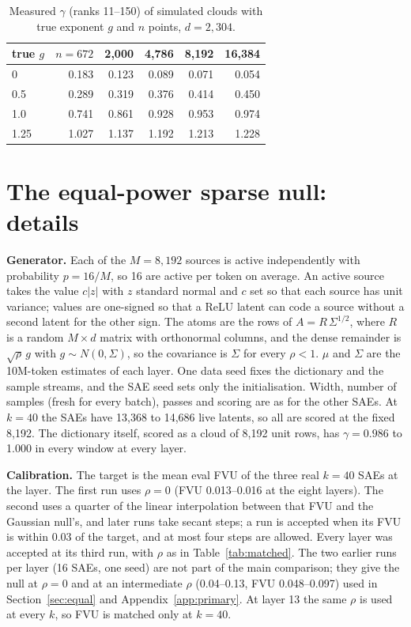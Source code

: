 \documentclass{article}
\newcommand{\Sig}{\Sigma}
\begin{document}
\begin{table}[!htb]
\centering
\caption{Measured $\gamma$ (ranks 11--150) of simulated clouds with true exponent $g$ and $n$ points, $d=2{,}304$.}
\label{tab:live}
\small
\begin{tabular}{l rrrrr}
\toprule
true $g$ & $n=672$ & 2,000 & 4,786 & 8,192 & 16,384 \\
\midrule
0 & 0.183 & 0.123 & 0.089 & 0.071 & 0.054 \\
0.5 & 0.289 & 0.319 & 0.376 & 0.414 & 0.450 \\
1.0 & 0.741 & 0.861 & 0.928 & 0.953 & 0.974 \\
1.25 & 1.027 & 1.137 & 1.192 & 1.213 & 1.228 \\
\bottomrule
\end{tabular}
\end{table}

\section{The equal-power sparse null: details}
\label{app:sparse2}

\textbf{Generator.} Each of the $M=8{,}192$ sources is active independently with probability $p=16/M$, so 16 are active per token on average. An active source takes the value $c|z|$ with $z$ standard normal and $c$ set so that each source has unit variance; values are one-signed so that a ReLU latent can code a source without a second latent for the other sign. The atoms are the rows of $A=R\,\Sig^{1/2}$, where $R$ is a random $M \times d$ matrix with orthonormal columns, and the dense remainder is $\sqrt{\rho}\,g$ with $g \sim N(0,\Sig)$, so the covariance is $\Sig$ for every $\rho<1$. $\mu$ and $\Sig$ are the 10M-token estimates of each layer. One data seed fixes the dictionary and the sample streams, and the SAE seed sets only the initialisation. Width, number of samples (fresh for every batch), passes and scoring are as for the other SAEs. At $k=40$ the SAEs have 13,368 to 14,686 live latents, so all are scored at the fixed 8,192. The dictionary itself, scored as a cloud of 8,192 unit rows, has $\gamma=0.986$ to 1.000 in every window at every layer.

\textbf{Calibration.} The target is the mean eval FVU of the three real $k=40$ SAEs at the layer. The first run uses $\rho=0$ (FVU 0.013--0.016 at the eight layers). The second uses a quarter of the linear interpolation between that FVU and the Gaussian null's, and later runs take secant steps; a run is accepted when its FVU is within 0.03 of the target, and at most four steps are allowed. Every layer was accepted at its third run, with $\rho$ as in Table~\ref{tab:matched}. The two earlier runs per layer (16 SAEs, one seed) are not part of the main comparison; they give the null at $\rho=0$ and at an intermediate $\rho$ (0.04--0.13, FVU 0.048--0.097) used in Section~\ref{sec:equal} and Appendix~\ref{app:primary}. At layer 13 the same $\rho$ is used at every $k$, so FVU is matched only at $k=40$.
\end{document}
